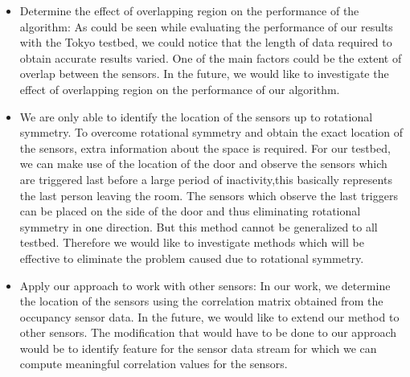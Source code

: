 \begin{itemize}
\item Determine the effect of overlapping region on the performance of the algorithm: As could be seen while evaluating the performance of our results with the Tokyo testbed, we could notice that the length of data required to obtain accurate results varied. One of the main factors could be the extent of overlap between the sensors. In the future, we would like to investigate the effect of overlapping region on the performance of our algorithm.
\item We are only able to identify the location of the sensors up to rotational symmetry. To overcome rotational symmetry and obtain the exact location of the sensors, extra information about the space is required. For our testbed, we can make use of the location of the door and observe the sensors which are triggered last before a large period of inactivity,this basically represents the last person leaving the room. The sensors which observe the last triggers can be placed on the side of the door and thus eliminating rotational symmetry in one direction. But this method cannot be generalized to all testbed. Therefore we would like to investigate methods which will be effective to eliminate the problem caused due to rotational symmetry.
\item Apply our approach to work with other sensors: In our work, we determine the location of the sensors using the correlation matrix obtained from the occupancy sensor data.
In the future, we would like to extend our method to other sensors. The modification that would have to be done to our approach would be to identify feature for the sensor data stream for which we can compute meaningful correlation values for the sensors.

\end{itemize}